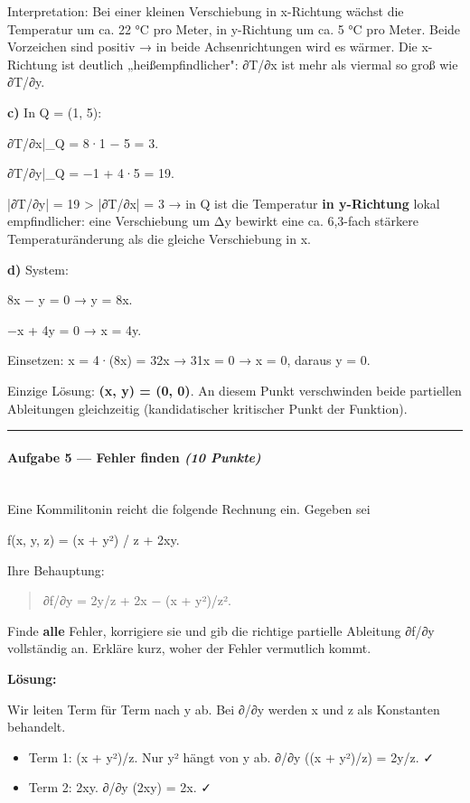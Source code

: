 \documentclass[11pt, a4paper]{article}
\begin{document}
Interpretation: Bei einer kleinen Verschiebung in x-Richtung wächst die Temperatur um ca. 22 °C pro Meter, in y-Richtung um ca. 5 °C pro Meter. Beide Vorzeichen sind positiv → in beide Achsenrichtungen wird es wärmer. Die x-Richtung ist deutlich „heißempfindlicher": ∂T/∂x ist mehr als viermal so groß wie ∂T/∂y.


\textbf{c)} In Q = (1, 5):


∂T/∂x|\_Q = 8·1 − 5 = 3.

∂T/∂y|\_Q = −1 + 4·5 = 19.


|∂T/∂y| = 19 > |∂T/∂x| = 3 → in Q ist die Temperatur \textbf{in y-Richtung} lokal empfindlicher: eine Verschiebung um Δy bewirkt eine ca. 6,3-fach stärkere Temperaturänderung als die gleiche Verschiebung in x.


\textbf{d)} System:


8x − y = 0 → y = 8x.

−x + 4y = 0 → x = 4y.


Einsetzen: x = 4·(8x) = 32x → 31x = 0 → x = 0, daraus y = 0.


Einzige Lösung: \textbf{(x, y) = (0, 0)}. An diesem Punkt verschwinden beide partiellen Ableitungen gleichzeitig (kandidatischer kritischer Punkt der Funktion).



\noindent\textcolor{rulegray}{\rule{\linewidth}{0.4pt}}


\paragraph{Aufgabe 5 — Fehler finden \textit{(10 Punkte)}}\mbox{}\\[2pt]

Eine Kommilitonin reicht die folgende Rechnung ein. Gegeben sei


f(x, y, z) = (x + y²) / z + 2xy.


Ihre Behauptung:


\begin{quote}
∂f/∂y = 2y/z + 2x − (x + y²)/z².
\end{quote}

Finde \textbf{alle} Fehler, korrigiere sie und gib die richtige partielle Ableitung ∂f/∂y vollständig an. Erkläre kurz, woher der Fehler vermutlich kommt.


\textbf{Lösung:}


Wir leiten Term für Term nach y ab. Bei ∂/∂y werden x und z als Konstanten behandelt.


\begin{itemize}
  \item Term 1: (x + y²)/z. Nur y² hängt von y ab. ∂/∂y ((x + y²)/z) = 2y/z. ✓
  \item Term 2: 2xy. ∂/∂y (2xy) = 2x. ✓
\end{itemize}
\end{document}
